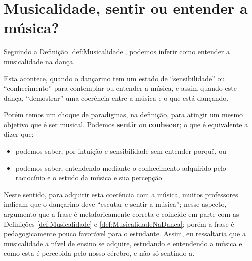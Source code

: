 
\section{Musicalidade, sentir ou entender a música?}
Seguindo a Definição \ref{def:Musicalidade}, podemos inferir como entender a musicalidade na dança.
\begin{definition} 
\label{def:MusicalidadeNaDanca}
Esta acontece, quando o dançarino tem um estado de ``sensibilidade'' ou ``conhecimento'' para contemplar ou entender a música,
e assim quando este dança, ``demostrar'' uma coerência entre a música e o que está dançando.
\end{definition}

Porém temos um choque de paradigmas, na definição, para atingir um mesmo objetivo que é ser musical.
Podemos \hyperref[ref:emotionsentimental]{\textbf{sentir}} ou 
\hyperref[subsec:tecnica-sentimentos]{\textbf{conhecer}}; o que é equivalente a dizer que:
\begin{itemize} 
\item podemos saber, por intuição e sensibilidade sem entender porquê, ou
\item podemos saber, entendendo mediante o conhecimento adquirido pelo raciocínio e o estudo da música e sua percepção.
\end{itemize}



Neste sentido, para adquirir esta coerência com a música, 
muitos professores indicam que o dançarino deve ``escutar e sentir a música'';
nesse aspecto, argumento que a frase é metaforicamente correta e coincide em parte com 
as Definições \ref{def:Musicalidade} e \ref{def:MusicalidadeNaDanca};
porém a frase  é pedagogicamente pouco favorável para o estudante.
Assim, eu ressaltaria que a musicalidade a nível de ensino se adquire,
estudando e entendendo a música e como esta é percebida pelo nosso cérebro, e não só sentindo-a.
 
